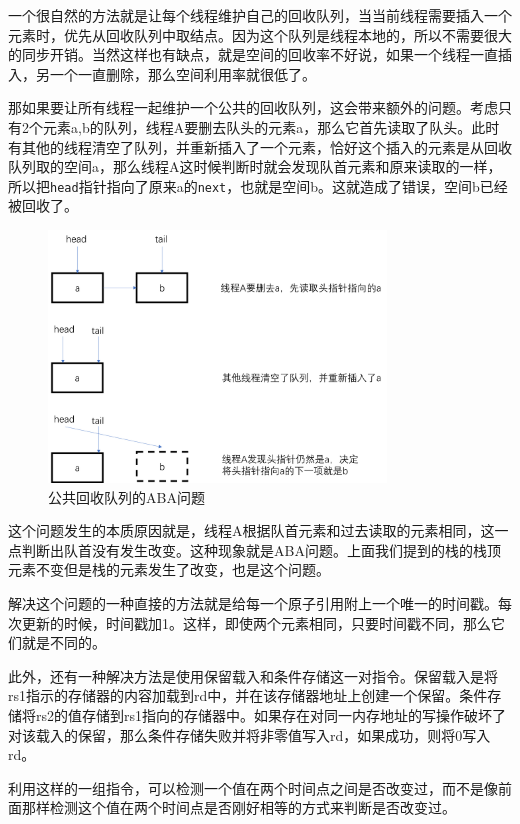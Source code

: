 \documentclass[a4paper, 11pt]{ctexart}
\begin{document}
一个很自然的方法就是让每个线程维护自己的回收队列，当当前线程需要插入一个元素时，优先从回收队列中取结点。因为这个队列是线程本地的，所以不需要很大的同步开销。当然这样也有缺点，就是空间的回收率不好说，如果一个线程一直插入，另一个一直删除，那么空间利用率就很低了。

那如果要让所有线程一起维护一个公共的回收队列，这会带来额外的问题。考虑只有2个元素a,b的队列，线程A要删去队头的元素a，那么它首先读取了队头。此时有其他的线程清空了队列，并重新插入了一个元素，恰好这个插入的元素是从回收队列取的空间a，那么线程A这时候判断时就会发现队首元素和原来读取的一样，所以把\lstinline|head|指针指向了原来a的\lstinline|next|，也就是空间b。这就造成了错误，空间b已经被回收了。

\begin{figure}[h]
    \centering
    \includegraphics[width=0.8\textwidth]{图片1.png} 
    \caption{公共回收队列的ABA问题} 
    \label{fig:my_label}
\end{figure}

这个问题发生的本质原因就是，线程A根据队首元素和过去读取的元素相同，这一点判断出队首没有发生改变。这种现象就是ABA问题。上面我们提到的栈的栈顶元素不变但是栈的元素发生了改变，也是这个问题。

解决这个问题的一种直接的方法就是给每一个原子引用附上一个唯一的时间戳。每次更新的时候，时间戳加1。这样，即使两个元素相同，只要时间戳不同，那么它们就是不同的。

此外，还有一种解决方法是使用保留载入和条件存储这一对指令。保留载入是将rs1指示的存储器的内容加载到rd中，并在该存储器地址上创建一个保留。条件存储将rs2的值存储到rs1指向的存储器中。如果存在对同一内存地址的写操作破坏了对该载入的保留，那么条件存储失败并将非零值写入rd，如果成功，则将0写入rd。

利用这样的一组指令，可以检测一个值在两个时间点之间是否改变过，而不是像前面那样检测这个值在两个时间点是否刚好相等的方式来判断是否改变过。
\end{document}
